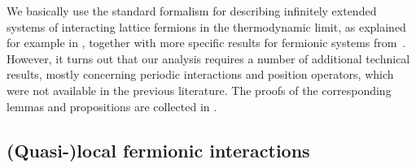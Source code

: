 \documentclass[a4paper]{article}
\theoremstyle{plain}
\theoremstyle{definition}
\theoremstyle{remark}
\renewcommand{\(}{\left(}
\renewcommand{\)}{\right)}
\begin{document}
We basically use the standard formalism for describing infinitely extended systems of interacting lattice fermions  in the thermodynamic limit, as explained for example in \cite{bratteliI,bratteliII},  together with more specific results for fermionic systems from~\cite{ArakiMoriya2002}. 
However, it turns out that our analysis requires a number of  additional  technical results, mostly concerning periodic interactions and position operators, which were not available in the previous literature. 
The proofs of the corresponding lemmas and propositions  are collected in \cite[Appendix~B]{WMMMT24}.

\subsection{(Quasi-)local fermionic interactions}
\end{document}
